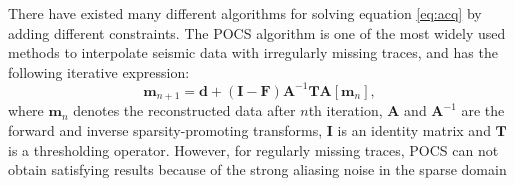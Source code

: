 There have existed many different algorithms for solving equation \ref{eq:acq} by adding different constraints. The POCS algorithm \cite{abma2006} is one of the most widely used methods to interpolate seismic data with irregularly missing traces, and has the following iterative expression:
\begin{equation} 
\label{eq:pocs}
\mathbf{m}_{n+1}=\mathbf{d}+(\mathbf{I}-\mathbf{F})\mathbf{A}^{-1}\mathbf{T}\mathbf{A}[\mathbf{m}_n],
\end{equation}
where $\mathbf{m}_n$ denotes the reconstructed data after $n$th iteration, $\mathbf{A}$ and $\mathbf{A}^{-1}$ are the forward and inverse sparsity-promoting transforms, $\mathbf{I}$ is an identity matrix and $\mathbf{T}$ is a thresholding operator. However, for regularly missing traces, POCS can not obtain satisfying results because of the strong aliasing noise in the sparse domain

